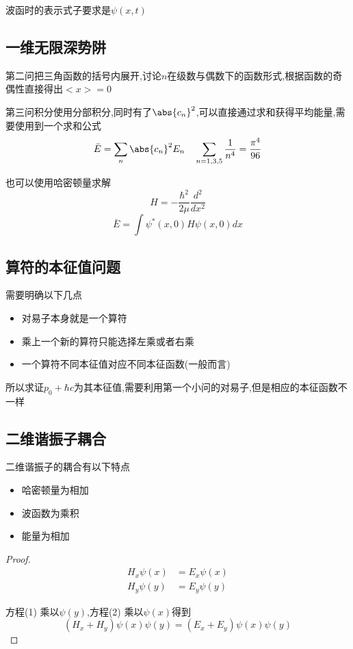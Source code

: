             波函时的表示式子要求是$\psi(x,t)$
        
        \subsection{一维无限深势阱}
            第二问把三角函数的括号内展开,讨论$n$在级数与偶数下的函数形式,根据函数的奇偶性直接得出$ < x > = 0 $

            第三问积分使用分部积分,同时有了$\abs{c_{n}}^{2}$,可以直接通过求和获得平均能量,需要使用到一个求和公式
            $$ \bar{E} = \sum_{n} \abs{c_{n}}^{2} E_{n} \quad \sum_{n=1,3,5} \frac{1}{n^{4}} = \frac{\pi^{4}}{96} $$

            也可以使用哈密顿量求解
            $$ H = - \frac{\hbar^{2}}{2\mu} \frac{d^2}{dx^{2}} $$
            $$ \bar{E} = \int \psi^{*}(x,0) H \psi(x,0) dx $$

        \subsection{算符的本征值问题}
            需要明确以下几点
            \begin{itemize}
                \item 对易子本身就是一个算符
                \item 乘上一个新的算符只能选择左乘或者右乘
                \item 一个算符不同本征值对应不同本征函数(一般而言)
            \end{itemize}
            
            所以求证$ p_{0}+\hbar c $为其本征值,需要利用第一个小问的对易子,但是相应的本征函数不一样

        \subsection{二维谐振子耦合}
            二维谐振子的耦合有以下特点
            \begin{itemize}
                \item 哈密顿量为相加    
                \item 波函数为乘积
                \item 能量为相加
            \end{itemize}

            \begin{proof}
                \pfindent

                \begin{align}
                    H_{x} \psi(x) &= E_{x} \psi(x)  \tag{1} \\
                    H_{y} \psi(y) &= E_{y} \psi(y)  \tag{2}
                \end{align}
                
                方程(1) 乘以$\psi(y)$,方程(2) 乘以$\psi(x)$得到
                $$ (H_{x}+H_{y}) \psi(x)\psi(y) = (E_{x}+E_{y}) \psi(x)\psi(y) $$
            \end{proof}


